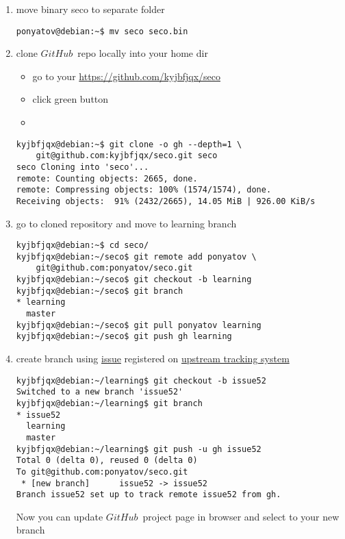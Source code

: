 \documentclass[oneside,10pt]{book}
\newcommand{\github}{$GitHub$}
\begin{document}
\begin{enumerate}[nosep]
  \item move binary seco to separate folder
\begin{verbatim}
ponyatov@debian:~$ mv seco seco.bin
\end{verbatim} 
\item clone \github\ repo locally into your home dir
\begin{itemize}[nosep]
  \item go to your \url{https://github.com/kyjbfjqx/seco}
  \item click  green button
\item {}
\end{itemize}
\begin{verbatim}
kyjbfjqx@debian:~$ git clone -o gh --depth=1 \
    git@github.com:kyjbfjqx/seco.git seco
seco Cloning into 'seco'...
remote: Counting objects: 2665, done.
remote: Compressing objects: 100% (1574/1574), done.
Receiving objects:  91% (2432/2665), 14.05 MiB | 926.00 KiB/s   
\end{verbatim}
\item go to cloned repository and move to learning branch  
\begin{verbatim}
kyjbfjqx@debian:~$ cd seco/
kyjbfjqx@debian:~/seco$ git remote add ponyatov \
    git@github.com:ponyatov/seco.git
kyjbfjqx@debian:~/seco$ git checkout -b learning
kyjbfjqx@debian:~/seco$ git branch
* learning
  master
kyjbfjqx@debian:~/seco$ git pull ponyatov learning
kyjbfjqx@debian:~/seco$ git push gh learning
\end{verbatim}
\clearpage
\item create branch using
\href{https://github.com/bolerio/seco/issues/52}{issue} registered on
\href{https://github.com/bolerio/seco/issues}{upstream tracking system}
\begin{verbatim}
kyjbfjqx@debian:~/learning$ git checkout -b issue52 
Switched to a new branch 'issue52'
kyjbfjqx@debian:~/learning$ git branch
* issue52
  learning
  master
kyjbfjqx@debian:~/learning$ git push -u gh issue52
Total 0 (delta 0), reused 0 (delta 0)
To git@github.com:ponyatov/seco.git
 * [new branch]      issue52 -> issue52
Branch issue52 set up to track remote issue52 from gh.
\end{verbatim}
Now you can update \github\ project page in browser and select to your new
branch 
\end{enumerate}
 
\end{document}
